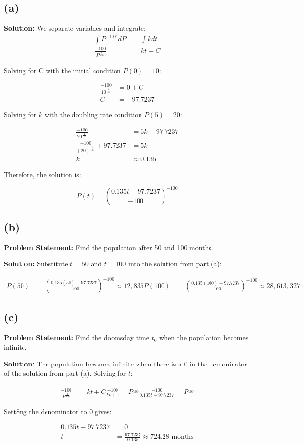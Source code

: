\documentclass[12pt, letterpaper]{article}
\begin{document}
\subsection*{(a)}
\textbf{Solution:}
We separate variables and integrate:
\begin{align*}
    \int P^{-1.01} dP &= \int k dt \\
    \frac{-100}{P^\frac{1}{100}} &= kt + C
\end{align*}

Solving for C with the initial condition $P(0) = 10$:

\begin{align*}
    \frac{-100}{10^\frac{1}{100}} &= 0 + C \\
    C &= -97.7237
\end{align*}

Solving for $k$ with the doubling rate condition $P(5) = 20$:

\begin{align*}
    \frac{-100}{20^\frac{1}{100}} &= 5k - 97.7237 \\
    \frac{-100}{(20)^\frac{1}{100}} + 97.7237 &= 5k \\
    k &\approx 0.135
\end{align*}

Therefore, the solution is:

\[
P(t) =  \left( \frac{0.135t - 97.7237}{-100} \right)^{-100}
\]
\subsection*{(b)}
\textbf{Problem Statement:}
Find the population after 50 and 100 months.

\textbf{Solution:}
Substitute $t = 50$ and $t = 100$ into the solution from part (a):

\begin{align*}
    P(50) &=  \left( \frac{0.135(50) - 97.7237}{-100} \right)^{-100} \approx 12,835
    P(100) &= \left( \frac{0.135(100) - 97.7237}{-100} \right)^{-100} \approx 28,613,327
\end{align*}

\subsection*{(c)}
\textbf{Problem Statement:}
Find the doomsday time $t_0$ when the population becomes infinite.

\textbf{Solution:}
The population becomes infinite when there is a 0 in the demoninator of the solution from part (a). Solving for $t$:

\begin{align*}
    \frac{-100}{P^\frac{1}{100}} &= kt + C
    \frac{-100}{kt + c} = P^\frac{1}{100}
    \frac{-100}{0.135t - 97.7237} = P^\frac{1}{100}
\end{align*}

Sett8ng the denominator to 0 gives:

\begin{align*}
    0.135t - 97.7237 &= 0 \\
    t &= \frac{97.7237}{0.135} \approx 724.28 \text{ months}
\end{align*}
\end{document}
